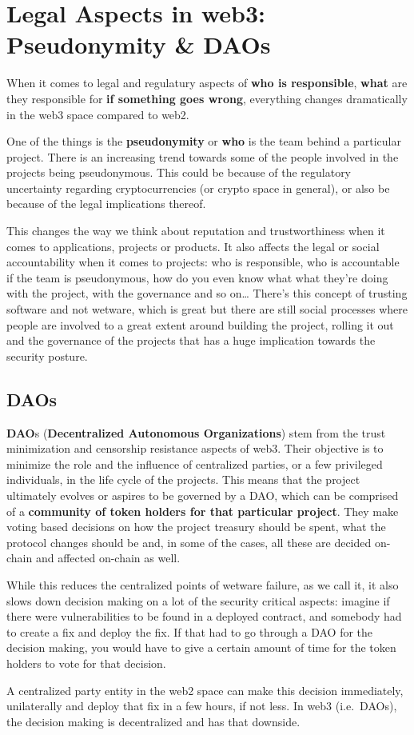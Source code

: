 \section{Legal Aspects in web3: Pseudonymity \&
DAOs}\label{legal-aspects-in-web3-pseudonymity-daos}

When it comes to legal and regulatury aspects of \textbf{who is
responsible}, \textbf{what} are they responsible for \textbf{if
something goes wrong}, everything changes dramatically in the web3 space
compared to web2.

One of the things is the \textbf{pseudonymity} or \textbf{who} is the
team behind a particular project. There is an increasing trend towards
some of the people involved in the projects being pseudonymous. This
could be because of the regulatory uncertainty regarding
cryptocurrencies (or crypto space in general), or also be because of the
legal implications thereof.

This changes the way we think about reputation and trustworthiness when
it comes to applications, projects or products. It also affects the
legal or social accountability when it comes to projects: who is
responsible, who is accountable if the team is pseudonymous, how do you
even know what what they're doing with the project, with the governance
and so on\ldots{} There's this concept of trusting software and not
wetware, which is great but there are still social processes where
people are involved to a great extent around building the project,
rolling it out and the governance of the projects that has a huge
implication towards the security posture.

\subsection{DAOs}\label{daos}

\textbf{DAO}s (\textbf{Decentralized Autonomous Organizations}) stem
from the trust minimization and censorship resistance aspects of web3.
Their objective is to minimize the role and the influence of centralized
parties, or a few privileged individuals, in the life cycle of the
projects. This means that the project ultimately evolves or aspires to
be governed by a DAO, which can be comprised of a \textbf{community of
token holders for that particular project}. They make voting based
decisions on how the project treasury should be spent, what the protocol
changes should be and, in some of the cases, all these are decided
on-chain and affected on-chain as well.

While this reduces the centralized points of wetware failure, as we call
it, it also slows down decision making on a lot of the security critical
aspects: imagine if there were vulnerabilities to be found in a deployed
contract, and somebody had to create a fix and deploy the fix. If that
had to go through a DAO for the decision making, you would have to give
a certain amount of time for the token holders to vote for that
decision.

A centralized party entity in the web2 space can make this decision
immediately, unilaterally and deploy that fix in a few hours, if not
less. In web3 (i.e.~DAOs), the decision making is decentralized and has
that downside.
